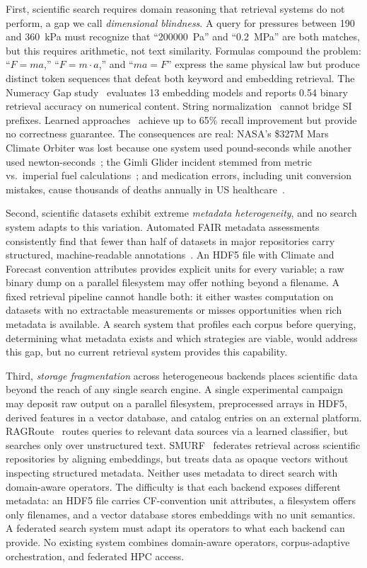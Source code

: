 First, scientific search requires domain reasoning that retrieval systems do not perform, a gap we call \emph{dimensional blindness}. A query for pressures between 190 and 360~kPa must recognize that ``200000~Pa'' and ``0.2~MPa'' are both matches, but this requires arithmetic, not text similarity. Formulas compound the problem: ``$F = ma$,'' ``$F = m \cdot a$,'' and ``$ma = F$'' express the same physical law but produce distinct token sequences that defeat both keyword and embedding retrieval. The Numeracy Gap study~\cite{numeracygap2026} evaluates 13 embedding models and reports 0.54 binary retrieval accuracy on numerical content. String normalization~\cite{numbersmatter2024} cannot bridge SI prefixes. Learned approaches~\cite{cone2026,ncretriever2025} achieve up to 65\% recall improvement but provide no correctness guarantee. The consequences are real: NASA's \$327M Mars Climate Orbiter was lost because one system used pound-seconds while another used newton-seconds~\cite{stephenson1999mco}; the Gimli Glider incident stemmed from metric vs.\ imperial fuel calculations~\cite{ward2021gimli}; and medication errors, including unit conversion mistakes, cause thousands of deaths annually in US healthcare~\cite{iom2006medication}.

Second, scientific datasets exhibit extreme \emph{metadata heterogeneity}, and no search system adapts to this variation. Automated FAIR metadata assessments consistently find that fewer than half of datasets in major repositories carry structured, machine-readable annotations~\cite{baker2016reproducibility}. An HDF5 file with Climate and Forecast convention attributes provides explicit units for every variable; a raw binary dump on a parallel filesystem may offer nothing beyond a filename. A fixed retrieval pipeline cannot handle both: it either wastes computation on datasets with no extractable measurements or misses opportunities when rich metadata is available. A search system that profiles each corpus before querying, determining what metadata exists and which strategies are viable, would address this gap, but no current retrieval system provides this capability.

Third, \emph{storage fragmentation} across heterogeneous backends places scientific data beyond the reach of any single search engine. A single experimental campaign may deposit raw output on a parallel filesystem, preprocessed arrays in HDF5, derived features in a vector database, and catalog entries on an external platform. RAGRoute~\cite{ragroute2025} routes queries to relevant data sources via a learned classifier, but searches only over unstructured text. SMURF~\cite{smurf2025} federates retrieval across scientific repositories by aligning embeddings, but treats data as opaque vectors without inspecting structured metadata. Neither uses metadata to direct search with domain-aware operators. The difficulty is that each backend exposes different metadata: an HDF5 file carries CF-convention unit attributes, a filesystem offers only filenames, and a vector database stores embeddings with no unit semantics. A federated search system must adapt its operators to what each backend can provide. No existing system combines domain-aware operators, corpus-adaptive orchestration, and federated HPC access.

